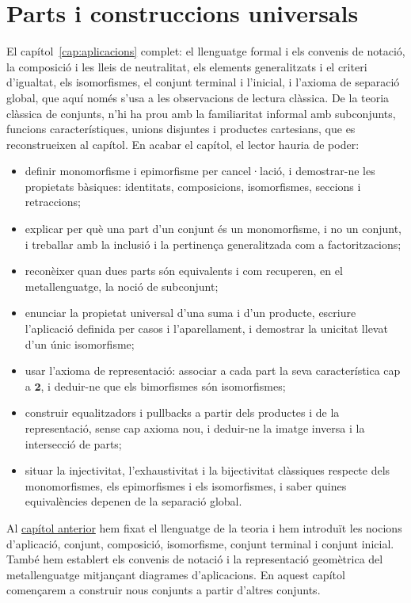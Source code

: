 \chapter{Parts i construccions universals}\label{cap:parts}

\begin{objectius}
 El capítol~\ref{cap:aplicacions} complet: el llenguatge formal i els convenis de notació, la composició i les lleis de neutralitat, els elements generalitzats i el criteri d'igualtat, els isomorfismes, el conjunt terminal i l'inicial, i l'axioma de separació global, que aquí només s'usa a les observacions de lectura clàssica. De la teoria clàssica de conjunts, n'hi ha prou amb la familiaritat informal amb subconjunts, funcions característiques, unions disjuntes i productes cartesians, que es reconstrueixen al capítol.
 En acabar el capítol, el lector hauria de poder:
\begin{itemize}
  \item definir monomorfisme i epimorfisme per cancel·lació, i demostrar-ne les propietats bàsiques: identitats, composicions, isomorfismes, seccions i retraccions;
  \item explicar per què una part d'un conjunt és un monomorfisme, i no un conjunt, i treballar amb la inclusió i la pertinença generalitzada com a factoritzacions;
  \item reconèixer quan dues parts són equivalents i com recuperen, en el metallenguatge, la noció de subconjunt;
  \item enunciar la propietat universal d'una suma i d'un producte, escriure l'aplicació definida per casos i l'aparellament, i demostrar la unicitat llevat d'un únic isomorfisme;
  \item usar l'axioma de representació: associar a cada part la seva característica cap a \(\mathbf2\), i deduir-ne que els bimorfismes són isomorfismes;
  \item construir equalitzadors i pullbacks a partir dels productes i de la representació, sense cap axioma nou, i deduir-ne la imatge inversa i la intersecció de parts;
  \item situar la injectivitat, l'exhaustivitat i la bijectivitat clàssiques respecte dels monomorfismes, els epimorfismes i els isomorfismes, i saber quines equivalències depenen de la separació global.
\end{itemize}
\end{objectius}

Al \hyperref[cap:aplicacions]{capítol anterior} hem fixat el llenguatge de la teoria i hem introduït les nocions d'aplicació, conjunt, composició, isomorfisme, conjunt terminal i conjunt inicial. També hem establert els convenis de notació i la representació geomètrica del metallenguatge mitjançant diagrames d'aplicacions. En aquest capítol començarem a construir nous conjunts a partir d'altres conjunts.


